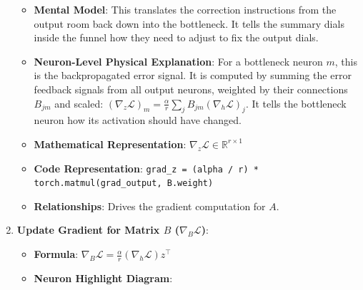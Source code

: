\documentclass{article}
\begin{document}
\begin{enumerate}
\begin{itemize}
      \item \textbf{Mental Model}: This translates the correction instructions from the output room back down into the bottleneck. It tells the summary dials inside the funnel how they need to adjust to fix the output dials.
      \item \textbf{Neuron-Level Physical Explanation}: For a bottleneck neuron $m$, this is the backpropagated error signal. It is computed by summing the error feedback signals from all output neurons, weighted by their connections $B_{jm}$ and scaled: $(\nabla_z \mathcal{L})_m = \frac{\alpha}{r} \sum_j B_{jm} (\nabla_h \mathcal{L})_j$. It tells the bottleneck neuron how its activation should have changed.
      \item \textbf{Mathematical Representation}: $\nabla_z \mathcal{L} \in \mathbb{R}^{r \times 1}$
      \item \textbf{Code Representation}: \texttt{grad\_z = (alpha / r) * torch.matmul(grad\_output, B.weight)}
      \item \textbf{Relationships}: Drives the gradient computation for $A$.
    \end{itemize}

  \item \textbf{Update Gradient for Matrix $B$ ($\nabla_B \mathcal{L}$)}:
    \begin{itemize}
      \item \textbf{Formula}: $\nabla_B \mathcal{L} = \frac{\alpha}{r} (\nabla_h \mathcal{L}) z^\top$
      \item \textbf{Neuron Highlight Diagram}:

\begin{center}
\begin{adjustbox}{max width=0.85\linewidth}
\end{adjustbox}
\end{center}
\end{itemize}
\end{enumerate}
\end{document}
